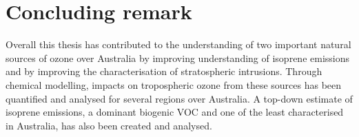   \section{Concluding remark}
  Overall this thesis has contributed to the understanding of two important natural sources of ozone over Australia by improving  understanding of isoprene emissions and by improving the characterisation of stratospheric intrusions.
  Through chemical modelling, impacts on tropospheric ozone from these sources has been quantified and analysed for several regions over Australia.
  A top-down estimate of isoprene emissions, a dominant biogenic VOC and one of the least characterised in Australia, has also been created and analysed.